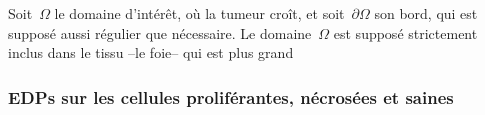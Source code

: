 \documentclass[main.tex]{subfiles}
\begin{document}
Soit~$\Omega$ le domaine d'intérêt, où la tumeur croît, et soit~$\partial\Omega$ son bord, qui est supposé aussi régulier que nécessaire. Le domaine~$\Omega$ est supposé strictement inclus dans le tissu --le foie-- qui est plus grand  

\subsubsection{EDPs sur les cellules proliférantes, nécrosées et saines}
\end{document}
